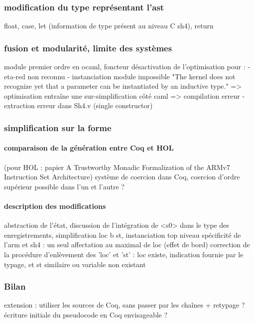 \documentclass[a4paper, 11pt]{article}
\begin{document}
    \subsubsection{modification du type représentant l'ast} 
    float, case, let (information de type présent au niveau C sh4), return
    \subsubsection{fusion et modularité, limite des systèmes}
    module premier ordre en ocaml, foncteur
    désactivation de l'optimisation pour :
      - eta-red non reconnu
      - instanciation module impossible "The kernel does not recognize yet that a parameter can be instantiated by an inductive type." => optimisation entraîne une sur-simplification côté caml => compilation erreur 
      - extraction erreur dans Sh4.v (single constructor)
      
    \subsubsection{simplification sur la forme}
      \paragraph{comparaison de la génération entre Coq et HOL}
      (pour HOL : papier A Trustworthy Monadic Formalization of the
ARMv7 Instruction Set Architecture)
      système de coercion dans Coq, coercion d'ordre supérieur possible dans l'un et l'autre ?
      \paragraph{description des modifications}
      abstraction de l'état, 
      discussion de l'intégration de <s0> dans le type des enregistrements,
      simplification {loc b st}, instanciation top niveau
      spécificité de l'arm et sh4 : un seul affectation au maximal de loc (effet de bord)
      correction de la procédure d'enlèvement des 'loc' et 'st' : loc existe, indication fournie par le typage, et st similaire ou variable non existant
    \subsubsection{Bilan}
    extension : utiliser les sources de Coq, sans passer par les chaînes + retypage ?
    écriture initiale du pseudocode en Coq envisageable ?
\end{document}
